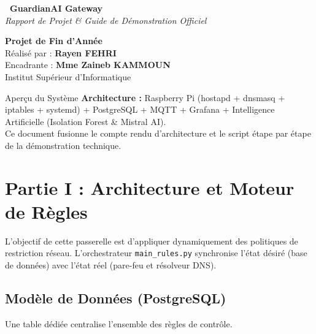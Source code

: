 \documentclass[11pt,a4paper]{article}
\begin{document}
\thispagestyle{empty}
\begin{center}
\vspace*{1.5cm}
\begin{tcolorbox}[
  colback=lightblue!35, colframe=blueTN, arc=6pt, boxrule=1.2pt,
  width=0.9\textwidth, halign=center, valign=center,
  top=16pt, bottom=16pt, left=10pt, right=10pt
]
{\fontsize{20pt}{24pt}\selectfont\textbf{\faNetworkWired\ GuardianAI Gateway}}\\[10pt]
{\large\textit{Rapport de Projet \& Guide de Démonstration Officiel}}
\end{tcolorbox}
\vspace{1cm}
{\Large\textbf{Projet de Fin d'Année}}\\[0.5cm]
{\large Réalisé par : \textbf{Rayen FEHRI}}\\
{\large Encadrante : \textbf{Mme Zaineb KAMMOUN}}\\
\vspace{0.5cm}
{\large Institut Supérieur d'Informatique}\\
\vspace{1.5cm}

\begin{choixcadre}{Aperçu du Système}
\textbf{Architecture :} Raspberry Pi (hostapd + dnsmasq + iptables + systemd) + PostgreSQL + MQTT + Grafana + Intelligence Artificielle (Isolation Forest \& Mistral AI).\\
Ce document fusionne le compte rendu d'architecture et le script étape par étape de la démonstration technique.
\end{choixcadre}

\end{center}
\newpage

\tableofcontents
\newpage

\section{Partie I : Architecture et Moteur de Règles}

L'objectif de cette passerelle est d'appliquer dynamiquement des politiques de restriction réseau. L'orchestrateur \texttt{main\_rules.py} synchronise l'état désiré (base de données) avec l'état réel (pare-feu et résolveur DNS).

\subsection{Modèle de Données (PostgreSQL)}
Une table dédiée centralise l'ensemble des règles de contrôle.
\end{document}
